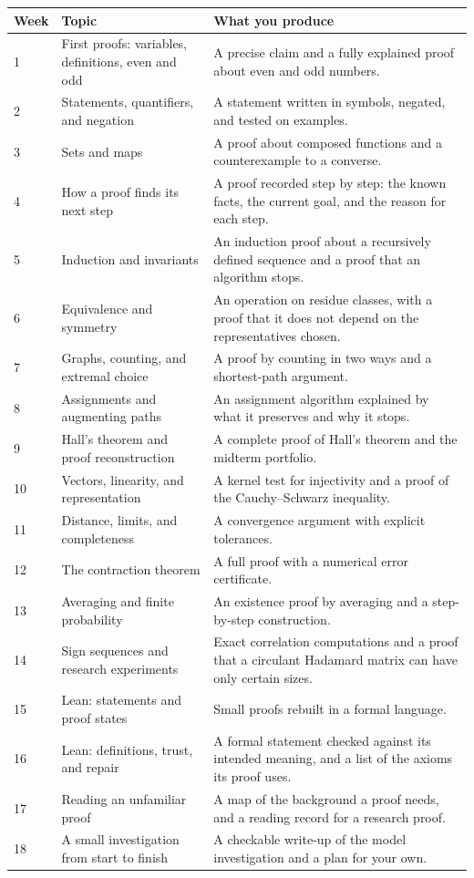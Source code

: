 \begingroup\small
\begin{longtable}{@{}p{0.34in}p{2.12in}p{2.87in}@{}}
\toprule Week & Topic & What you produce\\\midrule\endhead
1 & First proofs: variables, definitions, even and odd & A precise claim and a fully explained proof about even and odd numbers.\\
2 & Statements, quantifiers, and negation & A statement written in symbols, negated, and tested on examples.\\
3 & Sets and maps & A proof about composed functions and a counterexample to a converse.\\
4 & How a proof finds its next step & A proof recorded step by step: the known facts, the current goal, and the reason for each step.\\
5 & Induction and invariants & An induction proof about a recursively defined sequence and a proof that an algorithm stops.\\
6 & Equivalence and symmetry & An operation on residue classes, with a proof that it does not depend on the representatives chosen.\\
7 & Graphs, counting, and extremal choice & A proof by counting in two ways and a shortest-path argument.\\
8 & Assignments and augmenting paths & An assignment algorithm explained by what it preserves and why it stops.\\
9 & Hall's theorem and proof reconstruction & A complete proof of Hall's theorem and the midterm portfolio.\\
10 & Vectors, linearity, and representation & A kernel test for injectivity and a proof of the Cauchy--Schwarz inequality.\\
11 & Distance, limits, and completeness & A convergence argument with explicit tolerances.\\
12 & The contraction theorem & A full proof with a numerical error certificate.\\
13 & Averaging and finite probability & An existence proof by averaging and a step-by-step construction.\\
14 & Sign sequences and research experiments & Exact correlation computations and a proof that a circulant Hadamard matrix can have only certain sizes.\\
15 & Lean: statements and proof states & Small proofs rebuilt in a formal language.\\
16 & Lean: definitions, trust, and repair & A formal statement checked against its intended meaning, and a list of the axioms its proof uses.\\
17 & Reading an unfamiliar proof &A map of the background a proof needs, and a reading record for a research proof.\\
18 & A small investigation from start to finish & A checkable write-up of the model investigation and a plan for your own.\\
\bottomrule
\end{longtable}
\endgroup

